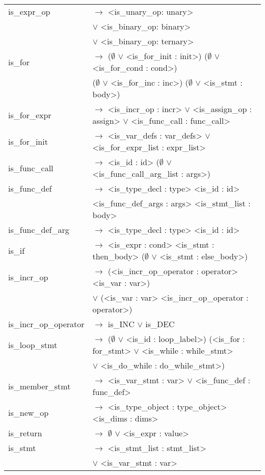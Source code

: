 \documentclass[a4paper]{article}
\begin{document}
\begin{tabular}{ll}
	is\_expr\_op				& $\to$ <is\_unary\_op: unary> \\
								& \;$\vee$ <is\_binary\_op: binary>\\
								& $\vee$ <is\_binary\_op: ternary>\\
	is\_for						& $\to$ ($\emptyset$ $\vee$ <is\_for\_init : init>) ($\emptyset$ $\vee$ <is\_for\_cond : cond>) \\ %
								& ($\emptyset$ $\vee$ <is\_for\_inc : inc>) ($\emptyset$ $\vee$ <is\_stmt : body>) \\
	is\_for\_expr				& $\to$ <is\_incr\_op : incr> $\vee$ <is\_assign\_op : assign> $\vee$ <is\_func\_call : func\_call> \\
	is\_for\_init				& $\to$ <is\_var\_defs : var\_defs> $\vee$ <is\_for\_expr\_list : expr\_list> \\
	is\_func\_call				& $\to$ <is\_id : id> ($\emptyset$ $\vee$ <is\_func\_call\_arg\_list : args>) \\
	is\_func\_def				& $\to$ <is\_type\_decl : type> <is\_id : id> \\ %
								& <is\_func\_def\_args : args> <is\_stmt\_list : body> \\
	is\_func\_def\_arg			& $\to$ <is\_type\_decl : type> <is\_id : id> \\
	is\_if						& $\to$ <is\_expr : cond> <is\_stmt : then\_body> ($\emptyset$ $\vee$ <is\_stmt : else\_body>) \\
	is\_incr\_op				& $\to$ (<is\_incr\_op\_operator : operator> <is\_var : var>) \\
								& $\vee$ (<is\_var : var> <is\_incr\_op\_operator : operator>) \\
	is\_incr\_op\_operator		& $\to$ is\_INC $\vee$ is\_DEC \\
	is\_loop\_stmt				& $\to$ ($\emptyset$ $\vee$ <is\_id : loop\_label>) (<is\_for : for\_stmt> $\vee$ <is\_while : while\_stmt> \\ 
								& $\vee$ <is\_do\_while : do\_while\_stmt>) \\
	is\_member\_stmt			& $\to$ <is\_var\_stmt : var> $\vee$ <is\_func\_def : func\_def> \\
	is\_new\_op					& $\to$ <is\_type\_object : type\_object> <is\_dims : dims> \\
	is\_return					& $\to$ $\emptyset$ $\vee$ <is\_expr : value> \\
	is\_stmt					& $\to$ <is\_stmt\_list : stmt\_list> \\
								& $\vee$ <is\_var\_stmt : var> \\

\end{tabular}
\end{document}
